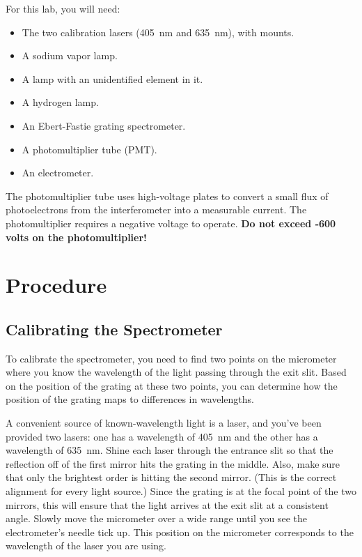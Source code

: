 \documentclass[]{manual}
\begin{document}
    For this lab, you will need:
    \begin{itemize}
        \item The two calibration lasers (\SI{405}{\nano\meter} and \SI{635}{\nano\meter}), with mounts.
        \item A sodium vapor lamp.
        \item A lamp with an unidentified element in it.
        \item A hydrogen lamp.
        \item An Ebert-Fastie grating spectrometer.
        \item A photomultiplier tube (PMT).
        \item An electrometer.
    \end{itemize}
    \noindent
    The photomultiplier tube uses high-voltage plates to convert a small flux of photoelectrons from the interferometer into a measurable current.
    The photomultiplier requires a negative voltage to operate.
    \textbf{Do not exceed -600 volts on the photomultiplier!}


    \FloatBarrier
    \newpage

    \section*{Procedure}

    \subsection{Calibrating the Spectrometer}

    To calibrate the spectrometer, you need to find two points on the micrometer  where you know the wavelength of the light passing through the exit slit.
    Based on the position of the grating at these two points, you can determine how the position of the grating maps to differences in wavelengths.

    A convenient source of known-wavelength light is a laser, and you've been provided two lasers: one has a wavelength of \SI{405}{\nano\meter} and the other has a wavelength of \SI{635}{\nano\meter}.
    Shine each laser through the entrance slit so that the reflection off of the first mirror hits the grating in the middle.
    Also, make sure that only the brightest order is hitting the second mirror.
    (This is the correct alignment for every light source.)
    Since the grating is at the focal point of the two mirrors, this will ensure that the light arrives at the exit slit at a consistent angle.
    Slowly move the micrometer over a wide range until you see the electrometer's needle tick up.
    This position on the micrometer corresponds to the wavelength of the laser you are using.
\end{document}
